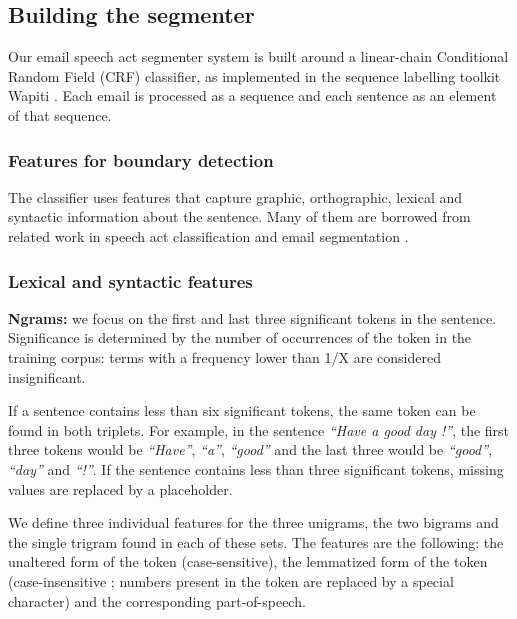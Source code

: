 \subsection{Building the segmenter}


Our email speech act segmenter system is built around a linear-chain Conditional Random Field (CRF) classifier, as implemented in the sequence labelling toolkit Wapiti \cite{lavergne2010practical}. Each email is processed as a sequence and each sentence as an element of that sequence.

\subsubsection{Features for boundary detection}

The classifier uses features that capture graphic, orthographic, lexical and syntactic information about the sentence. Many of them are borrowed from related work in speech act classification \cite{qadir2011classifying} and email segmentation \cite{lampert2009segmenting}.

\subsubsection{Lexical and syntactic features}

\textbf{Ngrams:} we focus on the first and last three significant tokens in the sentence. Significance is determined by the number of occurrences of the token in the training corpus: terms with a frequency lower than  1/X are considered insignificant. 

If a sentence contains less than six significant tokens, the same token can be found in both triplets. For example, in the sentence \textit{``Have a good day !''}, the first three tokens would be \textit{``Have''}, \textit{``a''}, \textit{``good''} and the last three would be \textit{``good''}, \textit{``day''} and \textit{``!''}. If the sentence contains less than three significant tokens, missing values are replaced by a placeholder.

We define three individual features for the three unigrams, the two bigrams and the single trigram found in each of these sets. The features are the following: the unaltered form of the token (case-sensitive), the lemmatized form of the token (case-insensitive ; numbers present in the token are replaced by a special character) and the corresponding part-of-speech.

